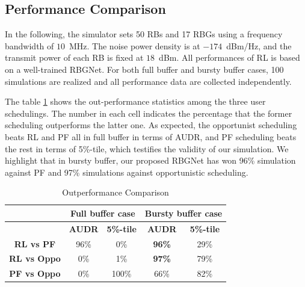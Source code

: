 \documentclass[conference,compsocconf]{IEEEtran}
\begin{document}
\subsection{Performance Comparison}
In the following, the simulator sets 50 RBs and 17 RBGs using a frequency bandwidth of $10$~MHz. The noise power density is at $-174$~dBm/Hz, and the transmit power of each RB is fixed at $18$~dBm. All performances of RL is based on a well-trained RBGNet. For both full buffer and bursty buffer cases, 100 simulations are realized and all performance data are collected independently.

The table \ref{tb:2} shows the out-performance statistics among the three user schedulings. The number in each cell indicates the percentage that the former scheduling outperforms the latter one. As expected, the opportunist scheduling beats RL and PF all in full buffer in terms of AUDR, and PF scheduling beats the rest in terms of 5\%-tile, which testifies the validity of our simulation. We highlight that in bursty buffer, our proposed RBGNet has won 96\% simulation against PF and 97\% simulations against opportunistic scheduling.

\renewcommand\arraystretch{1.5}
\begin{table}[H]
	\caption{Outperformance Comparison} \label{tb:2}
	\centering
	\begin{tabular}{c|c|c|c|c}
		\hline
		\textbf{}           & \multicolumn{2}{c|}{\textbf{Full buffer case}} & \multicolumn{2}{c}{\textbf{Bursty buffer case}} \\ \hline
		\textbf{}           & \textbf{AUDR}      & \textbf{5\%-tile}      & \textbf{AUDR}    & \textbf{5\%-tile}   \\ \hline
		\textbf{RL vs PF}   & 96\%         & 0\%                    & \textbf{96\%}                & 29\%                \\ \hline
		\textbf{RL vs Oppo} & 0\%                   & 1\%                    & \textbf{97\%}       & 79\%                \\ \hline
		\textbf{PF vs Oppo} & 0\%                   & 100\%         & 66\%                & 82\%      \\ \hline
	\end{tabular}
\end{table}
\end{document}
